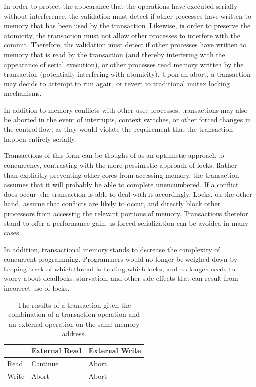 \documentclass{acm_proc_article-sp}
\begin{document}
In order to protect the appearance that the operations have executed serially
without interference, the validation must detect if other processes have
written to memory that has been used by the transaction. Likewise, in order to
preserve the atomicity, the transaction must not allow other processes to
interfere with the commit. Therefore, the validation must detect if other
processes have written to memory that is read by the transaction (and thereby
interfering with the appearance of serial execution), or other processes read
memory written by the transaction (potentially interfering with atomicity).
Upon an abort, a transaction may decide to attempt to run again, or revert to
traditional mutex locking mechanisms.~\cite{Herlihy:1993:TMA:173682.165164}

In addition to memory conflicts with other user processes, transactions may
also be aborted in the event of interrupts, context switches, or other forced
changes in the control flow, as they would violate the requirement that the
transaction happen entirely serially. 

Transactions of this form can be thought of as an optimistic approach to
concurrency, contrasting with the more pessimistic approach of locks.  Rather
than explicitly preventing other cores from accessing memory, the transaction
assumes that it will probably be able to complete unencumbered. If a conflict
does occur, the transaction is able to deal with it accordingly.  Locks, on the
other hand, assume that conflicts are likely to occur, and directly block other
processors from accessing the relevant portions of memory.  Transactions
therefor stand to offer a performance gain, as forced serialization can be
avoided in many cases.

In addition, transactional memory stands to decrease the complexity of
concurrent programming. Programmers would no longer be weighed down by keeping
track of which thread is holding which locks, and no longer needs to worry
about deadlocks, starvation, and other side effects that can result from
incorrect use of locks.

\begin{table}
\begin{center}
    \begin{tabular}{ l | l | l }
     & External Read & External Write \\
    \hline
    Read & Continue & Abort \\
    \hline
    Write & Abort & Abort \\
    \hline
    \end{tabular}
    \caption{The results of a transaction given the combination of a transaction
            operation and an external operation on the same memory address.}
\label{results_table}
\end{center}
\end{table}
\end{document}
